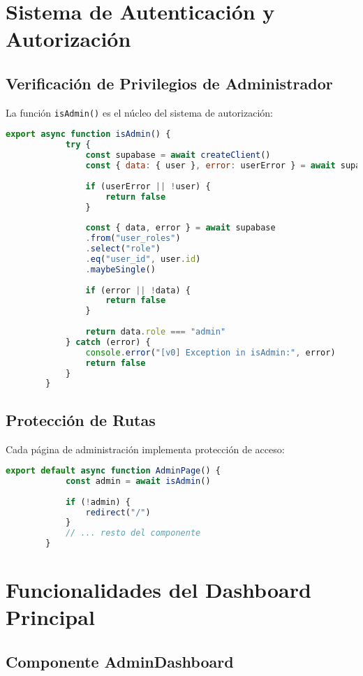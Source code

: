 \documentclass[12pt,a4paper]{article}
\begin{document}
	\section{Sistema de Autenticación y Autorización}
	
	\subsection{Verificación de Privilegios de Administrador}
	
	La función \texttt{isAdmin()} es el núcleo del sistema de autorización:
	
	\begin{lstlisting}[language=JavaScript, caption=Función isAdmin en admin-actions.ts]
		export async function isAdmin() {
			try {
				const supabase = await createClient()
				const { data: { user }, error: userError } = await supabase.auth.getUser()
				
				if (userError || !user) {
					return false
				}
				
				const { data, error } = await supabase
				.from("user_roles")
				.select("role")
				.eq("user_id", user.id)
				.maybeSingle()
				
				if (error || !data) {
					return false
				}
				
				return data.role === "admin"
			} catch (error) {
				console.error("[v0] Exception in isAdmin:", error)
				return false
			}
		}
	\end{lstlisting}
	
	\subsection{Protección de Rutas}
	
	Cada página de administración implementa protección de acceso:
	
	\begin{lstlisting}[language=JavaScript, caption=Protección de rutas en page.tsx]
		export default async function AdminPage() {
			const admin = await isAdmin()
			
			if (!admin) {
				redirect("/")
			}
			// ... resto del componente
		}
	\end{lstlisting}
	
	\section{Funcionalidades del Dashboard Principal}
	
	\subsection{Componente AdminDashboard}
	
\end{document}

